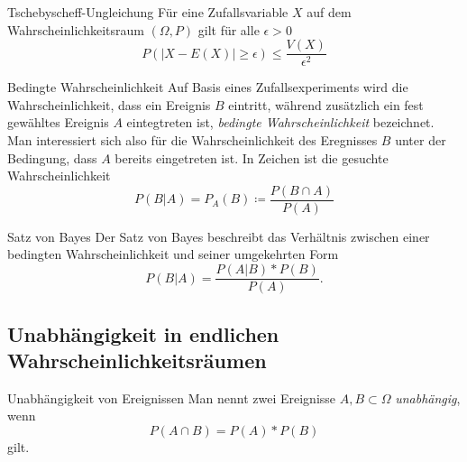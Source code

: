 \begin{satz}{Tschebyscheff-Ungleichung}\label{tschebyscheff}
	Für eine Zufallsvariable $X$ auf dem Wahrscheinlichkeitsraum $(\Omega,P)$ gilt für alle $\epsilon>0$
	\begin{equation*}
		P(|X-E(X)|\geq \epsilon)\leq \frac{V(X)}{\epsilon^2}
	\end{equation*}
\end{satz}

\begin{definition}{Bedingte Wahrscheinlichkeit}
	Auf Basis eines Zufallsexperiments wird die Wahrscheinlichkeit, dass ein Ereignis $B$ eintritt, während zusätzlich ein fest gewähltes Ereignis $A$ eintegtreten ist, \emph{bedingte Wahrscheinlichkeit} bezeichnet. Man interessiert sich also für die Wahrscheinlichkeit des Eregnisses $B$ unter der Bedingung, dass $A$ bereits eingetreten ist. In Zeichen ist die gesuchte Wahrscheinlichkeit
	\begin{equation*}
		P(B|A)=P_A(B)\coloneqq\frac{P(B\cap A)}{P(A)}
	\end{equation*}
\end{definition}

\begin{definition}{Satz von Bayes}
	Der Satz von Bayes beschreibt das Verhältnis zwischen einer bedingten Wahrscheinlichkeit und seiner umgekehrten Form
	\begin{equation*}
		P(B|A)=\frac{P(A|B)*P(B)}{P(A)}.
	\end{equation*}
\end{definition}

\subsection{Unabhängigkeit in endlichen Wahrscheinlichkeitsräumen}
\begin{definition}{Unabhängigkeit von Ereignissen}
	Man nennt zwei Ereignisse $A,B\subset \Omega$ \emph{unabhängig}, wenn
	\begin{equation*}
		P(A\cap B)=P(A)*P(B)
	\end{equation*}
	gilt.
\end{definition}
